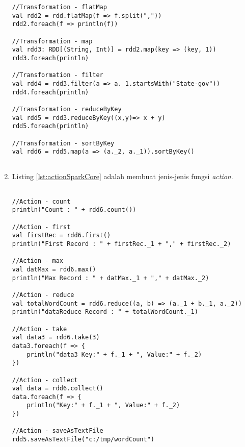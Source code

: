 \begin{enumerate}
\begin{lstlisting}[basicstyle=\ttfamily, frame=single,
	columns=fullflexible, keepspaces=true, breaklines=true, label=lst:transSparkCore, caption=Membuat Fungsi Transformation]
//Transformation - flatMap
val rdd2 = rdd.flatMap(f => f.split(","))
rdd2.foreach(f => println(f))

//Transformation - map
val rdd3: RDD[(String, Int)] = rdd2.map(key => (key, 1))
rdd3.foreach(println)

//Transformation - filter
val rdd4 = rdd3.filter(a => a._1.startsWith("State-gov"))
rdd4.foreach(println)

//Transformation - reduceByKey
val rdd5 = rdd3.reduceByKey((x,y)=> x + y)
rdd5.foreach(println)

//Transformation - sortByKey
val rdd6 = rdd5.map(a => (a._2, a._1)).sortByKey()
    
\end{lstlisting}

\newpage
\item Listing \ref{lst:actionSparkCore} adalah membuat jenis-jenis fungsi \textit{action}.
\begin{lstlisting}[basicstyle=\ttfamily, frame=single,
	columns=fullflexible, keepspaces=true, breaklines=true, label=lst:actionSparkCore, caption=Membuat Fungsi Action]

//Action - count
println("Count : " + rdd6.count())

//Action - first
val firstRec = rdd6.first()
println("First Record : " + firstRec._1 + "," + firstRec._2)

//Action - max
val datMax = rdd6.max()
println("Max Record : " + datMax._1 + "," + datMax._2)

//Action - reduce
val totalWordCount = rdd6.reduce((a, b) => (a._1 + b._1, a._2))
println("dataReduce Record : " + totalWordCount._1)

//Action - take
val data3 = rdd6.take(3)
data3.foreach(f => {
	println("data3 Key:" + f._1 + ", Value:" + f._2)
})

//Action - collect
val data = rdd6.collect()
data.foreach(f => {
	println("Key:" + f._1 + ", Value:" + f._2)
})

//Action - saveAsTextFile
rdd5.saveAsTextFile("c:/tmp/wordCount")
	
\end{lstlisting}

\end{enumerate}


